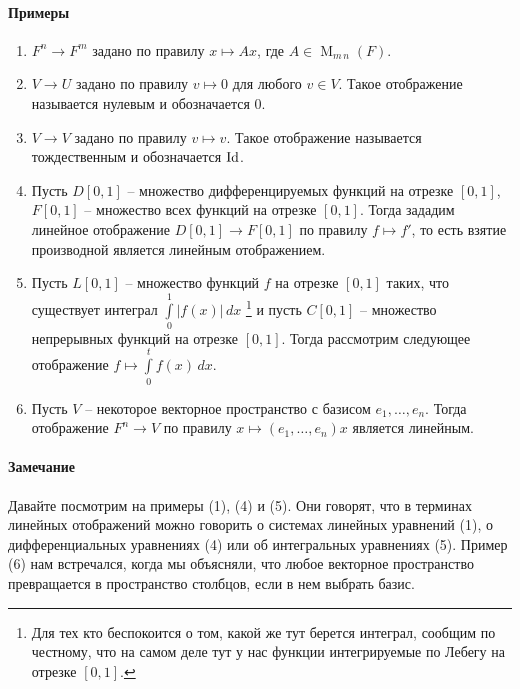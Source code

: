 \paragraph{Примеры}

\begin{enumerate}
\item $F^n \to F^m$ задано по правилу $x\mapsto Ax$, где $A\in \operatorname{M}_{m\,n}(F)$.

\item $V\to U$ задано по правилу $v\mapsto 0$ для любого $v\in V$.
Такое отображение называется нулевым и обозначается $0$.

\item $V\to V$ задано по правилу $v\mapsto v$.
Такое отображение называется тождественным и обозначается $\operatorname{Id}$.

\item Пусть $D[0,1]$ -- множество дифференцируемых функций на отрезке $[0,1]$, $F[0,1]$ -- множество всех функций на отрезке $[0,1]$.
Тогда зададим линейное отображение $D[0,1]\to F[0,1]$ по правилу $f\mapsto f'$, то есть взятие производной является линейным отображением.

\item Пусть $L[0,1]$ -- множество функций $f$ на отрезке $[0,1]$ таких, что существует интеграл $\int\limits_0^1 |f(x)|\,dx$%
\footnote{Для тех кто беспокоится о том, какой же тут берется интеграл, сообщим по честному, что на самом деле тут у нас функции интегрируемые по Лебегу на отрезке $[0,1]$.}
и пусть $C[0,1]$ -- множество непрерывных функций на отрезке $[0,1]$.
Тогда рассмотрим следующее отображение $f\mapsto \int\limits_0^t f(x)\,dx$.

\item Пусть $V$ -- некоторое векторное пространство с базисом $e_1,\ldots, e_n$.
Тогда отображение $F^n \to V$ по правилу $x \mapsto (e_1,\ldots,e_n)x$ является линейным.
\end{enumerate}

\paragraph{Замечание}

Давайте посмотрим на примеры (1), (4) и (5).
Они говорят, что в терминах линейных отображений можно говорить о системах линейных уравнений (1), о дифференциальных уравнениях (4) или об интегральных уравнениях (5).
Пример (6) нам встречался, когда мы объясняли, что любое векторное пространство превращается в пространство столбцов, если в нем выбрать базис.


